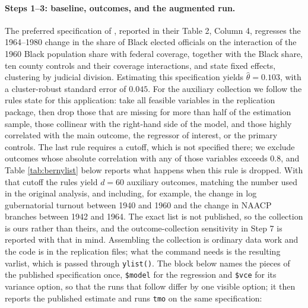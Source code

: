 \documentclass[varwidth,bib]{statapress}
\begin{document}
\paragraph{Steps 1--3: baseline, outcomes, and the augmented run.}
The preferred specification of \citet{Berninietal2023}, reported in their Table 2, Column 4, regresses the 1964--1980 change in the share of Black elected officials on the interaction of the 1960 Black population share with federal coverage, together with the Black share, ten county controls and their coverage interactions, and state fixed effects, clustering by judicial division.  Estimating this specification yields $\widehat\theta = 0.103$, with a cluster-robust standard error of $0.045$.  For the auxiliary collection we follow the rules \citet{Dellavignaetal2025} state for this application: take all feasible variables in the replication package, then drop those that are missing for more than half of the estimation sample, those collinear with the right-hand side of the model, and those highly correlated with the main outcome, the regressor of interest, or the primary controls.  The last rule requires a cutoff, which is not specified there; we exclude outcomes whose absolute correlation with any of those variables exceeds $0.8$, and Table \ref{tab:bernylist} below reports what happens when this rule is dropped.  With that cutoff the rules yield $d=60$ auxiliary outcomes, matching the number used in the original analysis, and including, for example, the change in log gubernatorial turnout between 1940 and 1960 and the change in NAACP branches between 1942 and 1964.  The exact list is not published, so the collection is ours rather than theirs, and the outcome-collection sensitivity in Step 7 is reported with that in mind.  Assembling the collection is ordinary data work and the code is in the replication files; what the command needs is the resulting varlist, which is passed through {\tt ylist()}.  The block below names the pieces of the published specification once, {\tt \$model} for the regression and {\tt \$vce} for its variance option, so that the runs that follow differ by one visible option; it then reports the published estimate and runs {\tt tmo} on the same specification:

\begin{stlog}

\end{stlog}
\end{document}
